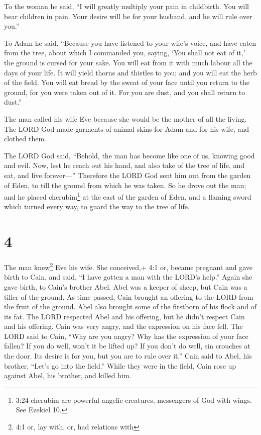 To the woman he said, ``I will greatly multiply your pain
in childbirth. You will bear children in pain. Your desire will be for
your husband, and he will rule over you.''

 To Adam he said, ``Because you have listened to your
wife's voice, and have eaten from the tree, about which I commanded you,
saying, `You shall not eat of it,' the ground is cursed for your sake.
You will eat from it with much labour all the days of your life.
 It will yield thorns and thistles to you; and you will eat
the herb of the field.  You will eat bread by the sweat of
your face until you return to the ground, for you were taken out of it.
For you are dust, and you shall return to dust.''

 The man called his wife Eve because she would be the
mother of all the living.  The LORD God made garments of
animal skins for Adam and for his wife, and clothed them.

 The LORD God said, ``Behold, the man has become like one
of us, knowing good and evil. Now, lest he reach out his hand, and also
take of the tree of life, and eat, and live forever---'' 
Therefore the LORD God sent him out from the garden of Eden, to till the
ground from which he was taken.  So he drove out the man;
and he placed cherubim\footnote{3:24 cherubim are powerful angelic
  creatures, messengers of God with wings. See Ezekiel 10.} at the east
of the garden of Eden, and a flaming sword which turned every way, to
guard the way to the tree of life.

\hypertarget{section-3}{%
\section{4}\label{section-3}}

 The man knew\footnote{4:1 or, lay with, or, had relations
  with} Eve his wife. She conceived,+ 4:1 or, became pregnant and gave
birth to Cain, and said, ``I have gotten a man with the LORD's help.''
 Again she gave birth, to Cain's brother Abel. Abel was a
keeper of sheep, but Cain was a tiller of the ground.  As
time passed, Cain brought an offering to the LORD from the fruit of the
ground.  Abel also brought some of the firstborn of his
flock and of its fat. The LORD respected Abel and his offering,
 but he didn't respect Cain and his offering. Cain was very
angry, and the expression on his face fell.  The LORD said
to Cain, ``Why are you angry? Why has the expression of your face
fallen?  If you do well, won't it be lifted up? If you don't
do well, sin crouches at the door. Its desire is for you, but you are to
rule over it.''  Cain said to Abel, his brother, ``Let's go
into the field.'' While they were in the field, Cain rose up against
Abel, his brother, and killed him.

